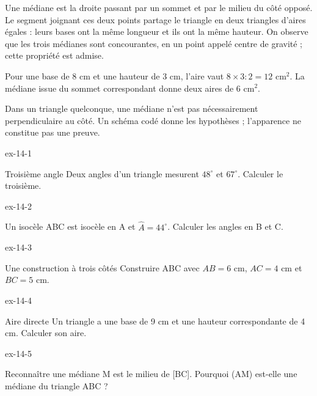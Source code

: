 \begin{definition}Une médiane est la droite passant par un sommet et par le milieu du côté opposé. Le segment joignant ces deux points partage le triangle en deux triangles d’aires égales : leurs bases ont la même longueur et ils ont la même hauteur. On observe que les trois médianes sont concourantes, en un point appelé centre de gravité ; cette propriété est admise.\end{definition}
\begin{exemple}Pour une base de 8 cm et une hauteur de 3 cm, l’aire vaut $8\times3:2=12$ cm$^2$. La médiane issue du sommet correspondant donne deux aires de 6 cm$^2$.\end{exemple}
\begin{attention}Dans un triangle quelconque, une médiane n’est pas nécessairement perpendiculaire au côté. Un schéma codé donne les hypothèses ; l’apparence ne constitue pas une preuve.\end{attention}

\clearpage{}
\begin{blocLivre}{ex-14-1}\begin{exercice}[1]{Troisième angle}
Deux angles d’un triangle mesurent $48^\circ$ et $67^\circ$. Calculer le troisième.
\label{fig-ex-14-1}
\end{exercice}\end{blocLivre}
\begin{blocLivre}{ex-14-2}\begin{exercice}[1]{Un isocèle}
ABC est isocèle en A et $\widehat A=44^\circ$. Calculer les angles en B et C.
\label{fig-ex-14-2}
\end{exercice}\end{blocLivre}
\begin{blocLivre}{ex-14-3}\begin{exercice}[1]{Une construction à trois côtés}
Construire ABC avec $AB=6$ cm, $AC=4$ cm et $BC=5$ cm.
\label{fig-ex-14-3}
\end{exercice}\end{blocLivre}
\begin{blocLivre}{ex-14-4}\begin{exercice}[1]{Aire directe}
Un triangle a une base de 9 cm et une hauteur correspondante de 4 cm. Calculer son aire.
\label{fig-ex-14-4}
\end{exercice}\end{blocLivre}
\begin{blocLivre}{ex-14-5}\begin{exercice}[1]{Reconnaître une médiane}
M est le milieu de [BC]. Pourquoi (AM) est-elle une médiane du triangle ABC ?
\label{fig-ex-14-5}
\end{exercice}\end{blocLivre}

